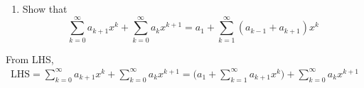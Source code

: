 \begin{example}
    \begin{enumerate}
        \item Show that
        \[
            \sum^\infty_{k=0} a_{k+1}x^k + \sum^\infty_{k=0} a_kx^{k+1} = a_1 + \sum^\infty_{k=1} (a_{k-1} +
            a_{k+1})x^k
        \]
    \end{enumerate}
\end{example}
\begin{solution}
    From LHS,
    \begin{align*}
        \text{LHS} = \sum^\infty_{k=0} a_{k+1}x^k + \sum^\infty_{k=0} a_kx^{k+1}
        = \biggl( a_1 + \sum_{k=1}^{\infty} a_{k+1} x^k \biggr) + \sum_{k=0}^{\infty} a_k x^{k+1}
    \end{align*}
\end{solution}